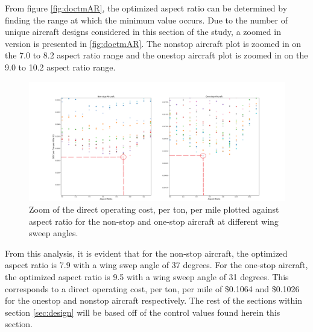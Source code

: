 \documentclass{article}
\begin{document}
\begin{flushleft}
            From figure \ref{fig:doctmAR}, the optimized aspect ratio can be
            determined by finding the range at which the minimum value occurs.
            Due to the number of unique aircraft designs considered in this
            section of the study, a zoomed in version is presented in
            \ref{fig:doctmAR}. The nonstop aircraft plot is zoomed in on the 7.0
            to 8.2 aspect ratio range and the onestop aircraft plot is zoomed in
            on the 9.0 to 10.2 aspect ratio range.

            \begin{figure}[ht]
                \centering
                \includegraphics[scale=0.244]{DOCTM v Sweep Angle Zoom.PNG}
                \caption{Zoom of the direct operating cost, per ton, per mile plotted against aspect ratio for the non-stop and one-stop aircraft at different wing sweep angles.}
                \label{fig:doctmARzoom}
            \end{figure}

            From this analysis, it is evident that for the non-stop aircraft,
            the optimized aspect ratio is 7.9 with a wing swep angle of 37
            degrees. For the one-stop aircraft, the optimized aspect ratio is
            9.5 with a wing sweep angle of 31 degrees. This corresponds to a
            direct operating cost, per ton, per mile of \$0.1064 and \$0.1026
            for the onestop and nonstop aircraft respectively. The rest of the
            sections within section \ref{sec:design} will be based off of the
            control values found herein this section.
        \end{flushleft}
\end{document}
